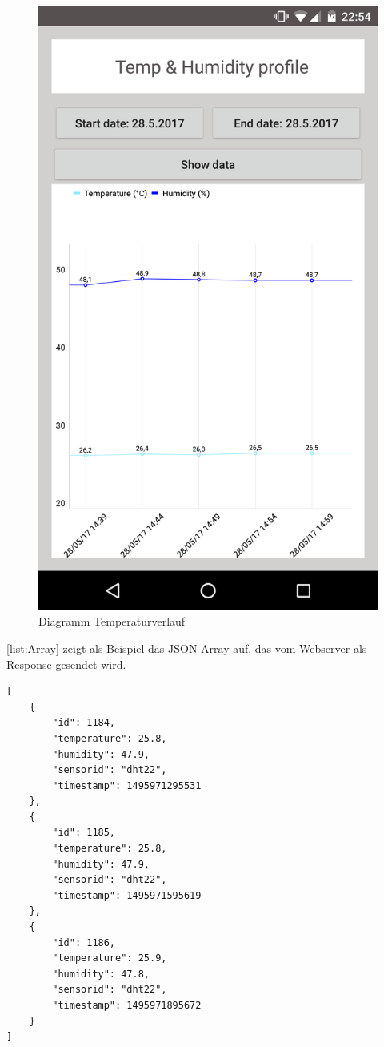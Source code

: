 \begin{figure}[h]
	\centering
	\includegraphics[scale=0.1]{images/appVerlauf}
	\caption{Diagramm Temperaturverlauf}
	\label{label:temVerlauf}
\end{figure}

\autoref{list:Array} zeigt als Beispiel das \ac{JSON}-Array auf, das vom Webserver als Response gesendet wird. 
\begin{lstlisting}[label=list:Array, caption={Beispiel: JSON Array}]
[
	{
		"id": 1184,
		"temperature": 25.8,
		"humidity": 47.9,
		"sensorid": "dht22",
		"timestamp": 1495971295531
	},
	{
		"id": 1185,
		"temperature": 25.8,
		"humidity": 47.9,
		"sensorid": "dht22",
		"timestamp": 1495971595619
	},
	{
		"id": 1186,
		"temperature": 25.9,
		"humidity": 47.8,
		"sensorid": "dht22",
		"timestamp": 1495971895672
	}
]
\end{lstlisting}

